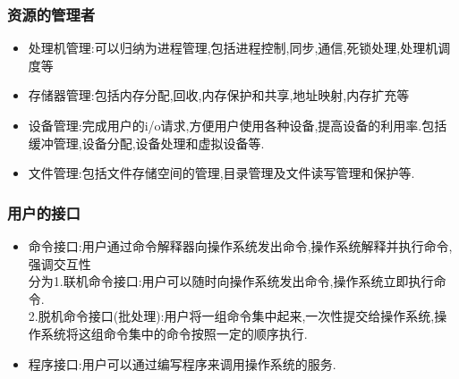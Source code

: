 \documentclass{ctexart}
\begin{document}
\subsubsection{资源的管理者}
\begin{itemize}
    \item 处理机管理:可以归纳为进程管理,包括进程控制,同步,通信,死锁处理,处理机调度等
    \item 存储器管理:包括内存分配,回收,内存保护和共享,地址映射,内存扩充等
    \item 设备管理:完成用户的i/o请求,方便用户使用各种设备,提高设备的利用率.包括缓冲管理,设备分配,设备处理和虚拟设备等.
    \item 文件管理:包括文件存储空间的管理,目录管理及文件读写管理和保护等.
\end{itemize}
\subsubsection{用户的接口}
\begin{itemize}
    \item 命令接口:用户通过命令解释器向操作系统发出命令,操作系统解释并执行命令,强调交互性\\
    分为1.联机命令接口:用户可以随时向操作系统发出命令,操作系统立即执行命令.\\
    2.脱机命令接口(批处理):用户将一组命令集中起来,一次性提交给操作系统,操作系统将这组命令集中的命令按照一定的顺序执行.
    \item 程序接口:用户可以通过编写程序来调用操作系统的服务.
\end{itemize}
\end{document}
